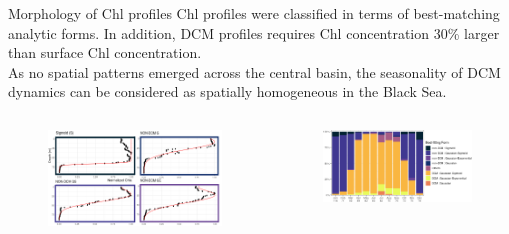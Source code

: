 \documentclass[final]{beamer}
\begin{document}
\begin{frame}[fragile]
\begin{columns}[T]
      
      \begin{column}{.64\textwidth}
      

	\begin{block}{Morphology of Chl profiles}
	Chl profiles were classified in terms of best-matching analytic forms. 
	In addition, DCM profiles requires Chl concentration 30\% larger than surface Chl concentration.\\
	As no spatial patterns emerged across the central basin, the seasonality of DCM dynamics can be considered as spatially homogeneous in the Black Sea. 
	  \begin{columns}[T]
	  
	    \begin{column}{.32\textwidth}
	   	     \begin{figure}
     		\includegraphics[width=.9\columnwidth]{figs/DCMforms_nonDCM.png}
		    \end{figure}
	    \end{column}
	    
	    \begin{column}{.32\textwidth}
	      \begin{figure}
     		\includegraphics[width=\columnwidth]{figs/FIG3-G.png}
		    \end{figure}
	    \end{column}
	  

\end{columns}
\end{block}
\end{column}
\end{columns}
\end{frame}
\end{document}
